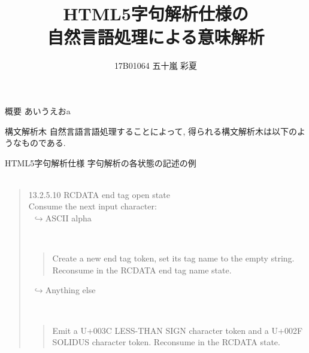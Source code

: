 \documentclass[dvipdfmx]{beamer}
\title[HTML5字句解析仕様の自然言語処理による意味解析]{HTML5字句解析仕様の\\自然言語処理による意味解析}
\author[五十嵐 彩夏]{17B01064 五十嵐 彩夏}
\institute[東工大]{東京工業大学 情報理工学院 数理・計算科学系}
\date{}
\begin{document}
\begin{frame}\frametitle{}
  \titlepage
\end{frame}

\begin{frame}{概要}
あいうえおa
\end{frame}

\begin{frame}{構文解析木}
   自然言語言語処理することによって, 得られる構文解析木は以下のようなものである. 

\end{frame}


\begin{frame}{HTML5字句解析仕様}
   字句解析の各状態の記述の例 \\
   
   　

\begin{quote}
   13.2.5.10 RCDATA end tag open state\\
   Consume the next input character:\\
   $\ \ \hookrightarrow$ASCII alpha

   \ 
   \begin{quote}
      Create a new end tag token, set its tag name to the empty string. 
      Reconsume in the RCDATA end tag name state. 
   \end{quote}
   $\ \ \hookrightarrow $Anything else

   \ 
   \begin{quote}
      Emit a U+003C LESS-THAN SIGN character token and a U+002F SOLIDUS character token. 
      Reconsume in the RCDATA state.
   \end{quote}
\end{quote}
\end{frame}
\end{document}
